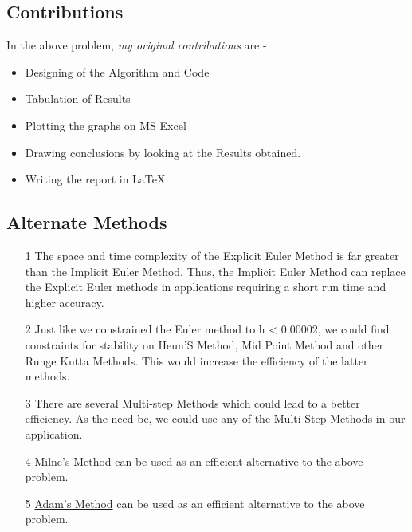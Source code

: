 \documentclass[titlepage, 11pt]{article}
\begin{document}
\inputminted[breaklines,
 mathescape,
 linenos,
 numbersep=5pt,
 frame=single,
 numbersep=5pt,
 xleftmargin=0pt]{c}{Explicit_Euler.c}
\label{listing:5}

\inputminted[breaklines,
 mathescape,
 linenos,
 numbersep=5pt,
 frame=single,
 numbersep=5pt,
 xleftmargin=0pt]{c}{Implicit_Euler.c}
\label{listing:6}


\subsection{Contributions}
In the above problem, \textit{my original contributions} are - 
\begin{itemize}
    \item Designing of the Algorithm and Code
    \item Tabulation of Results
    \item Plotting the graphs on MS Excel
    \item Drawing conclusions by looking at the Results obtained.
    \item Writing the report in LaTeX. 
\end{itemize}


\subsection{Alternate Methods}

\begin{itemize}
    \item [1] The space and time complexity of the Explicit Euler Method is far greater than the Implicit Euler Method. Thus, the Implicit Euler Method can replace the Explicit Euler methods in applications requiring a short run time and higher accuracy. 
    \item [2] Just like we constrained the Euler method to h < 0.00002, we could find constraints for stability on Heun'S Method, Mid Point Method and other Runge Kutta Methods. This would increase the efficiency of the latter methods. 
    \item [3] There are several Multi-step Methods which could lead to a better efficiency. As the need be, we could use any of the Multi-Step Methods in our application. 
    \item [4] \href{https://encyclopediaofmath.org/wiki/Milne_method#:~:text=A%20finite%2Ddifference%20method%20for,y(a)%3Db.}{Milne's Method} can be used as an efficient alternative to the above problem.
    \item [5] \href{https://web.mit.edu/10.001/Web/Course_Notes/Differential_Equations_Notes/node6.html}{Adam's Method} can be used as an efficient alternative to the above problem.
\end{itemize}
\end{document}
